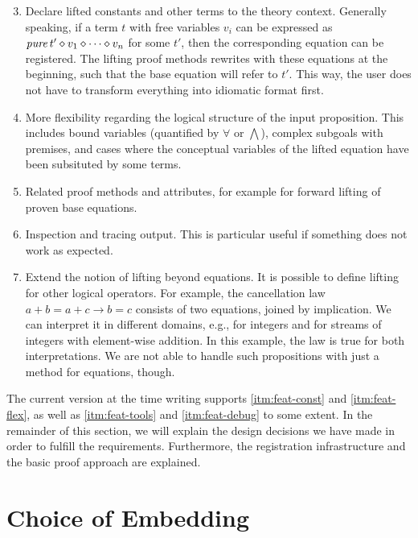 \begin{enumerate}
\setcounter{enumi}{2}
\item\label{itm:feat-const}
	Declare lifted constants and other terms to the theory context.
	Generally speaking, if a term $t$ with free variables $v_i$ can be expressed
	as $\operatorname{\mathit{pure}} t' \diamond v_1 \diamond \cdots \diamond v_n$ for some $t'$, then the
	corresponding equation can be registered.
	The lifting proof methods rewrites with these equations at the beginning,
	such that the base equation will refer to $t'$.
	This way, the user does not have to transform everything into idiomatic
	format first.
\item\label{itm:feat-flex}
	More flexibility regarding the logical structure of the input proposition.
	This includes bound variables (quantified by $\forall$ or $\bigwedge$),
	complex subgoals with premises, and cases where the conceptual variables
	of the lifted equation have been subsituted by some terms.
\item\label{itm:feat-tools}
	Related proof methods and attributes, for example for forward lifting
	of proven base equations.
\item\label{itm:feat-debug}
	Inspection and tracing output.
	This is particular useful if something does not work as expected.
\item\label{itm:feat-xprops}
	Extend the notion of lifting beyond equations.
	It is possible to define lifting for other logical operators.
	For example, the cancellation law $a + b = a + c \longrightarrow b = c$
	consists of two equations, joined by implication.
	We can interpret it in different domains, e.g., for integers and for
	streams of integers with element-wise addition.
	In this example, the law is true for both interpretations.
	We are not able to handle such propositions with just a method for
	equations, though.
\end{enumerate}

The current version at the time writing supports \ref{itm:feat-const} and
\ref{itm:feat-flex}, as well as \ref{itm:feat-tools} and \ref{itm:feat-debug}
to some extent.
In the remainder of this section, we will explain the design decisions we
have made in order to fulfill the requirements.
Furthermore, the registration infrastructure and the basic proof approach are
explained.


\section{Choice of Embedding}\label{subsec:embedding}

